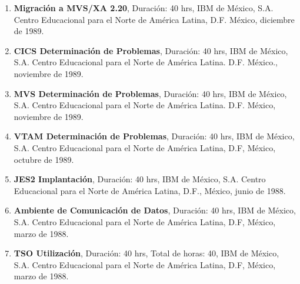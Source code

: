 \begin{enumerate}
\item \textbf{Migración a MVS/XA 2.20}, Duración: 40 hrs,  
IBM de 
México, S.A. Centro Educacional para el Norte de América Latina, D.F. México, diciembre de 
1989.

\item \textbf{CICS Determinación de Problemas}, Duración: 40 hrs,  
IBM 
de México, S.A. Centro Educacional para el Norte de América Latina. D.F. México., noviembre de 
1989.

\item \textbf{MVS Determinación de Problemas}, Duración: 40 hrs, 
IBM 
de México, S.A. Centro Educacional para el Norte de América Latina. D.F. México, noviembre de 
1989.

\item \textbf{VTAM Determinación de Problemas}, Duración: 40 hrs,  
IBM 
de México, S.A. Centro Educacional para el Norte de América Latina, D.F, México, octubre de 
1989.

\item \textbf{JES2 Implantación}, Duración: 40 hrs, IBM de 
México, 
S.A. Centro Educacional para el Norte de América Latina, D.F., México, junio de 1988.

\item \textbf{Ambiente de Comunicación de Datos}, Duración: 40 hrs, IBM
de México, S.A. Centro Educacional para el Norte de América Latina, D.F, México, marzo de 1988.

\item \textbf{TSO Utilización}, Duración: 40 hrs, Total de horas: 40, IBM     
de México, S.A. Centro Educacional para el Norte de América Latina, D.F, México,
marzo de 1988.
\end{enumerate}



